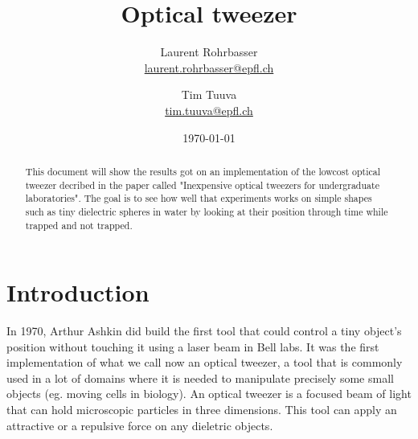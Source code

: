 \documentclass[a4paper,12pt,twoside]{article}	%
\newcommand{\mail}[1]{{\href{mailto:#1}{#1}}}
\begin{document}
\title{Optical tweezer}
\date{\today}
\author{
	Laurent Rohrbasser\\{\small \mail{laurent.rohrbasser@epfl.ch}} \and 
	Tim Tuuva\\{\small \mail{tim.tuuva@epfl.ch}}
	}
\maketitle

\tableofcontents %

\baselineskip=16pt
\parindent=15pt
\parskip=5pt

\begin{abstract}

This document will show the results got on an implementation of the lowcost optical tweezer decribed in the paper called "Inexpensive optical tweezers for undergraduate laboratories". The goal is to see how well that experiments works on simple shapes such as tiny dielectric spheres in water by looking at their position through time while trapped and not trapped.

\end{abstract}

\section{Introduction}
In 1970, Arthur Ashkin did build the first tool that could control a tiny object's position without touching it using a laser beam in Bell labs. It was the first implementation of what we call now an optical tweezer, a tool that is commonly used in a lot of domains where it is needed to manipulate precisely some small objects (eg. moving cells in biology). An optical tweezer is a focused beam of light that can hold microscopic particles in three dimensions. This tool can apply an attractive or a repulsive force on any dieletric objects. 
\end{document}
